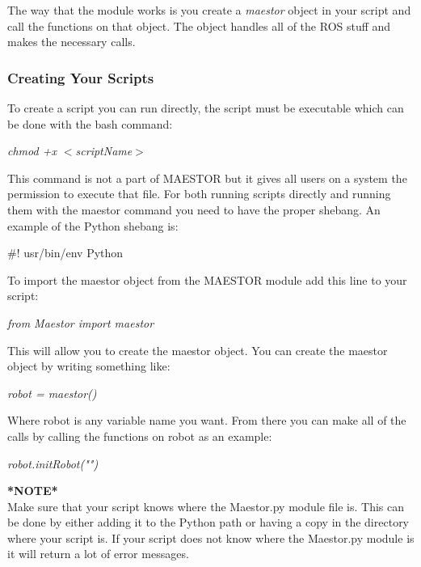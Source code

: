 \documentclass[12pt]{article}
\begin{document}
\noindent The way that the module works is you create a \textit{maestor} object in your script and call the functions on that object. The object handles all of the ROS stuff and makes the necessary calls. 

\subsubsection{Creating Your Scripts}

To create a script you can run directly, the script must be executable which can be done with the bash command:

\begin{center}
	\textit{chmod +x $<$scriptName$>$}
\end{center}

This command is not a part of MAESTOR but it gives all users on a system the permission to execute that file. For both running scripts directly and running them with the maestor command you need to have the proper shebang. An example of the Python shebang is:

\begin{center}
	\#! usr/bin/env Python
\end{center} 

To import the maestor object from the MAESTOR module add this line to your script:

\begin{center}
	\textit{from Maestor import maestor}
\end{center}

This will allow you to create the maestor object. You can create the maestor object by writing something like: 

\begin{center}
	\textit{robot = maestor()}
\end{center}

Where robot is any variable name you want. From there you can make all of the calls by calling the functions on robot as an example:

\begin{center}
	\textit{robot.initRobot("")}
\end{center}

\noindent \textbf{*NOTE*}\\
\noindent Make sure that your script knows where the Maestor.py module file is. This can be done by either adding it to the Python path or having a copy in the directory where your script is. If your script does not know where the Maestor.py module is it will return a lot of error messages.  
\end{document}
